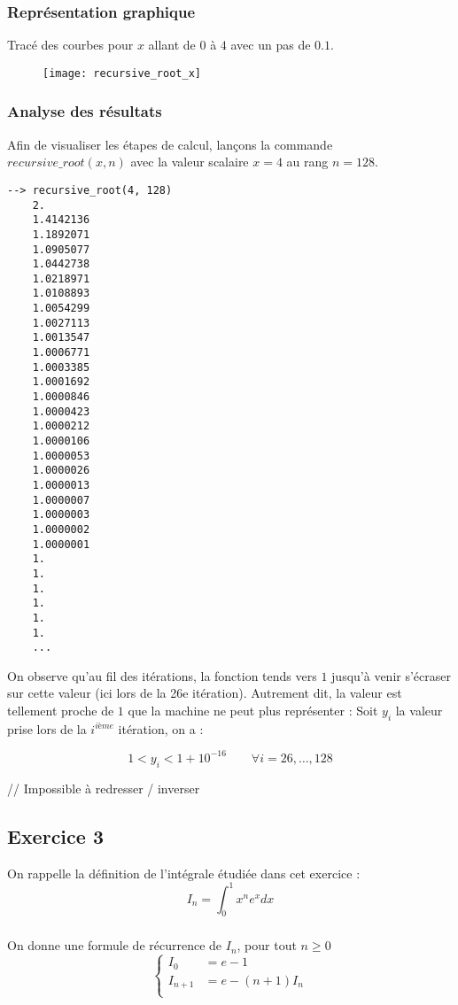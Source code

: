 \documentclass[a4paper,12pt]{article}
\begin{document}
\subsubsection{Représentation graphique}
Tracé des courbes pour $x$ allant de $0$ à $4$ avec un pas de $0.1$.

\begin{figure}[h]
    \centering
    \texttt{[image: recursive\_root\_x]}
\end{figure}

\subsubsection{Analyse des résultats}

Afin de visualiser les étapes de calcul, lançons la commande $recursive\_root(x, n)$ avec la valeur scalaire $x = 4$ au rang $n = 128$.

\begin{verbatim}
--> recursive_root(4, 128)
    2.
    1.4142136
    1.1892071
    1.0905077
    1.0442738
    1.0218971
    1.0108893
    1.0054299
    1.0027113
    1.0013547
    1.0006771
    1.0003385
    1.0001692
    1.0000846
    1.0000423
    1.0000212
    1.0000106
    1.0000053
    1.0000026
    1.0000013
    1.0000007
    1.0000003
    1.0000002
    1.0000001
    1.
    1.
    1.
    1.
    1.
    1.
    ...
\end{verbatim}

On observe qu'au fil des itérations, la fonction tends vers $1$ jusqu'à venir s'écraser sur cette valeur (ici lors de la 26e itération). Autrement dit, la valeur est tellement proche de $1$ que la machine ne peut plus représenter : Soit $y_i$ la valeur prise lors de la $i^{ième}$ itération, on a :

$$
1 < y_i < 1 + 10^{-16} \qquad \forall i = 26,\dots,128
$$

// Impossible à redresser / inverser


\subsection{ Exercice 3}
On rappelle la définition de l'intégrale étudiée dans cet exercice :
$$
I_n=\int _0^1x^ne^xdx
$$
\subsubsection{}

On donne une formule de récurrence de $I_n$, pour tout $n \geq 0$
$$
  \left\{ \begin{aligned}
    I_0&=e-1\\
    I_{n+1}&=e-(n+1)I_n\\
  \end{aligned} \right.
$$
\end{document}
